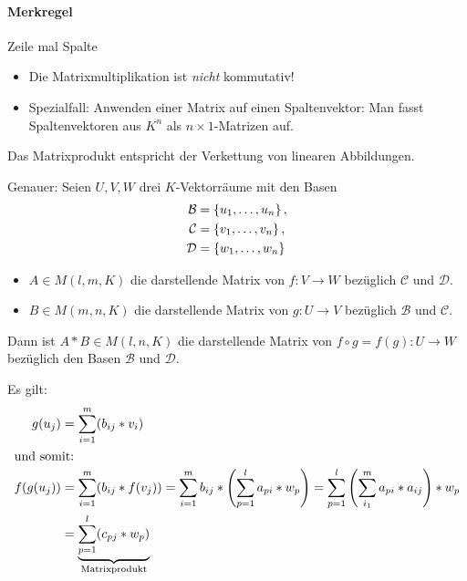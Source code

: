 \paragraph{Merkregel} Zeile mal Spalte

\bemerkung
\begin{itemize}
	\item Die Matrixmultiplikation ist \emph{nicht} kommutativ!
	\item Spezialfall: Anwenden einer Matrix auf einen Spaltenvektor: Man fasst Spaltenvektoren aus $K^n$ als $n\times 1$-Matrizen auf.
\end{itemize}

\begin{satz}{}
	Das Matrixprodukt entspricht der Verkettung von linearen Abbildungen.
\end{satz}
Genauer: Seien $U,V,W$ drei $K$-Vektorräume mit den Basen
\begin{align*}
	\mathcal{B}&=\left\{ u_1,\ldots, u_n \right\},\\
	\mathcal{C}&=\left\{ v_1,\ldots, v_n \right\},\\
	\mathcal{D}&=\left\{ w_1,\ldots, w_n \right\}
\end{align*}

\begin{itemize}
	\item $A\in M(l,m,K)$ die darstellende Matrix von $f:V\rightarrow W$ bezüglich $\mathcal{C}$ und $\mathcal{D}$.
	\item $B\in M(m,n,K)$ die darstellende Matrix von $g:U\rightarrow V$ bezüglich $\mathcal{B}$ und $\mathcal{C}$.
\end{itemize}
Dann ist $A*B\in M(l,n,K)$ die darstellende Matrix von $f\circ g = f(g):U\rightarrow W$ bezüglich den Basen $\mathcal{B}$ und $\mathcal{D}$.

\beweis
Es gilt:
\begin{align*}
	g(u_j)&=\sum\limits_{i=1}^m ( b_{ij} * v_i )\\
	\intertext{und somit:}
	f(g(u_j)) &= \sum\limits_{i=1}^m ( b_{ij} * f(v_j) ) = \sum\limits_{i=1}^m b_{ij} * \left( \sum\limits_{p=1}^l a_{pi} * w_p \right) =\sum\limits_{p=1}^l \left( \sum\limits_{i_1}^m a_{pi}*a_{ij} \right) * w_p\\
	&= \underbrace{\sum\limits_{p=1}^l (c_{pj} * w_p)}_\text{Matrixprodukt}
\end{align*}
